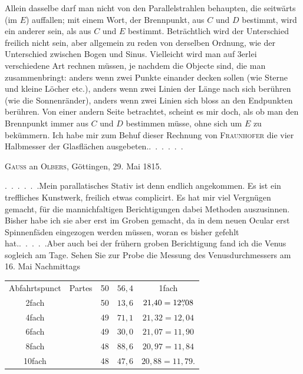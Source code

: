 \begin{center}\end{center}
\noindent Allein dasselbe darf man nicht von den Parallelstrahlen behaupten, die seitwärts (im $E$) auffallen; mit einem Wort, der Brennpunkt, aus $C$ und $D$ bestimmt, wird ein anderer sein, als aus $C$ und $E$ bestimmt. Beträchtlich wird der Unterschied freilich nicht sein, aber allgemein zu reden von derselben Ordnung, wie der Unterschied zwischen Bogen und Sinus. Vielleicht wird man auf 3erlei verschiedene Art rechnen müssen, je nachdem die Objecte sind, die man zusammenbringt: anders wenn zwei Punkte einander decken sollen (wie Sterne und kleine Löcher etc.), anders wenn zwei Linien der Länge nach sich berühren (wie die Sonnenränder), anders wenn zwei Linien sich bloss an den Endpunkten berühren. Von einer andern Seite betrachtet, scheint es mir doch, als ob man den Brennpunkt immer aus $C$ und $D$ bestimmen müsse, ohne sich um $E$ zu bekümmern. Ich habe mir zum Behuf dieser Rechnung von \textsc{Fraunhofer} die vier Halbmesser der Glasflächen ausgebeten.\quad\mbox{. . . . . .}
\begin{center}\textsc{Gauss} an \textsc{Olbers}, Göttingen, 29. Mai 1815.\end{center}
\noindent\hspace*{\parindent}\mbox{. . . . . .}\quad Mein parallatisches Stativ ist denn endlich angekommen. Es ist ein treffliches Kunstwerk, freilich etwas complicirt. Es hat mir viel Vergnügen gemacht, für die mannichfaltigen Berichtigungen dabei Methoden auszusinnen.
\clearpage{}
\noindent Bisher habe ich sie aber erst im Groben gemacht, da in dem neuen Ocular erst Spinnenfäden eingezogen werden müssen, woran es bisher gefehlt hat.\quad\mbox{. . . . .}\quad Aber auch bei der frühern groben Berichtigung fand ich die Venus sogleich am Tage. Sehen Sie zur Probe die Messung des Venusdurchmessers am 16. Mai Nachmittags
\begin{center}\renewcommand{\arraystretch}{1.15}\begin{tabular}{clrrc}
Abfahrtspunct&Partes&50&$56{,}4$&1fach\\
2fach&&50&$13{,}6$&$21{,}40=12\mathord{\overset{\prime\prime}{,}}08$\\
4fach&&49&$71{,}1$&$21{,}32=12{,}04$\\
6fach&&49&$30{,}0$&$21{,}07=11{,}90$\\
8fach&&48&$88{,}6$&$20{,}97=11{,}84$\\
10fach&&48&$47{,}6$&$20{,}88=11{,}79$.
\end{tabular}\end{center}
